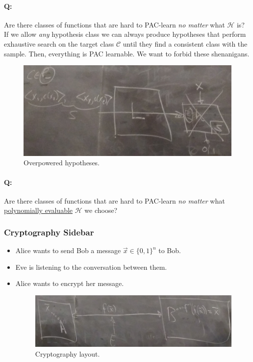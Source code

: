\documentclass[12pt, letterpaper]{article}
\numberwithin{equation}{section} %
\newcommand{\ul}{\underline}
\newcommand{\mc}{\mathcal}
\theoremstyle{definition}
\theoremstyle{remark}
\begin{document}
\paragraph{Q:}Are there classes of functions that are hard to PAC-learn \emph{no matter} what $\mc H$ is?\\

If we allow \emph{any} hypothesis class we can always produce hypotheses that perform exhaustive search on the target class $\mc C$ until they find a consistent class with the sample. Then, everything is PAC learnable. We want to forbid these shenanigans.
\begin{figure}[H]
\centering
\includegraphics[width=0.6\linewidth]{../img/pac.jpg}
\caption{Overpowered hypotheses.}
\end{figure}

\paragraph{Q:}Are there classes of functions that are hard to PAC-learn \emph{no matter} what \ul{polynomially evaluable} $\mc H$ we choose?

\subsubsection{Cryptography Sidebar}
\begin{itemize}
\item Alice wants to send Bob a message $\vec x\in \lbrace 0, 1\rbrace^n$ to Bob.
\item Eve is listening to the conversation between them.
\item Alice wants to encrypt her message.
\begin{figure}[H]
\centering
\includegraphics[width=0.6\linewidth]{../img/crypto.jpg}
\caption{Cryptography layout.}
\end{figure}
\end{itemize}
\end{document}

